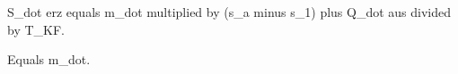 S_dot erz equals m_dot multiplied by (s_a minus s_1) plus Q_dot aus divided by T_KF.  

Equals m_dot.